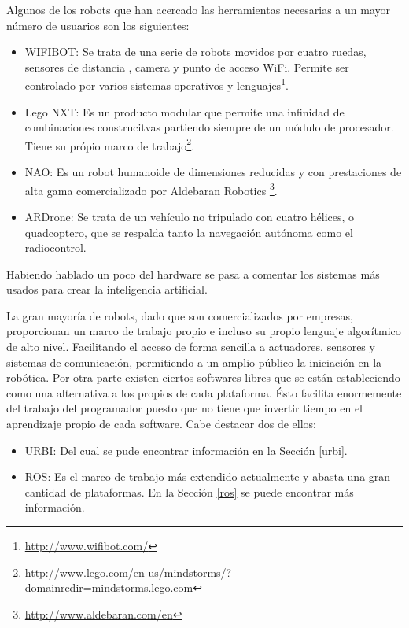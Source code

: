\documentclass[12pt,a4paper,final,twoside]{book}
\begin{document}
Algunos de los robots que han acercado las herramientas necesarias a un mayor número de usuarios son los siguientes: 

\begin{itemize}
\item WIFIBOT: Se trata de una serie de robots movidos por cuatro ruedas, sensores de distancia , camera y punto de acceso WiFi. Permite ser controlado por varios sistemas operativos y lenguajes\footnote{\url{http://www.wifibot.com/}}.
\item Lego NXT: Es un producto modular que permite una infinidad de combinaciones construcitvas partiendo siempre de un módulo de procesador. Tiene su própio marco de trabajo\footnote{\url{http://www.lego.com/en-us/mindstorms/?domainredir=mindstorms.lego.com}}.
\item NAO: Es un robot humanoide de dimensiones reducidas y con prestaciones de alta gama comercializado por Aldebaran Robotics \footnote{\url{http://www.aldebaran.com/en}}.
\item ARDrone: Se trata de un vehículo no tripulado con cuatro hélices, o quadcoptero,  que se respalda tanto la navegación autónoma como el radiocontrol.
\end{itemize}

Habiendo hablado un poco del hardware se pasa a comentar los sistemas más usados para crear la inteligencia artificial.

La gran mayoría de robots, dado que son comercializados por empresas, proporcionan un marco de trabajo propio e incluso su propio lenguaje algorítmico de alto nivel. Facilitando el acceso de forma sencilla a actuadores, sensores y sistemas de comunicación, permitiendo a un amplio público la iniciación en la robótica.
Por otra parte existen ciertos softwares libres que se están estableciendo como una alternativa a los propios de cada plataforma.
Ésto facilita enormemente del trabajo del programador puesto que no tiene que invertir tiempo en el aprendizaje propio de cada software. 
Cabe destacar dos de ellos:

\begin{itemize}
\item URBI\cite{urbiref}: Del cual se pude encontrar información en la Sección \ref{urbi}.
\item ROS: Es el marco de trabajo más extendido actualmente y abasta una gran cantidad de plataformas. En la Sección \ref{ros} se puede encontrar más información.
\end{itemize} 
\end{document}

